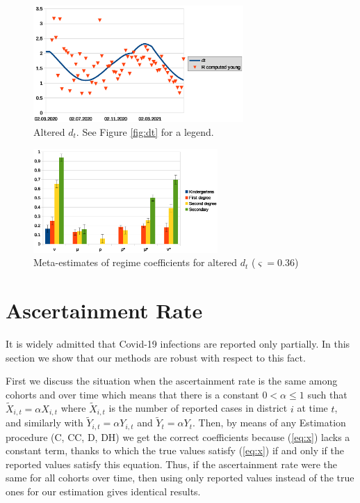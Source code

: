 \documentclass[fleqn,10pt]{wlscirep}
\begin{document}
\begin{figure}
\begin{center}
\includegraphics[width=8cm]{dtalt.eps} 
\caption{Altered $d_t$. See Figure \ref{fig:dt} for a legend.
}
\label{fig:dtalt}
\end{center}
\end{figure}

\begin{figure}
\begin{center}
\includegraphics[width=7cm]{coefsalt.eps}
\caption{Meta-estimates of regime coefficients for altered $d_t$ ($\varsigma=0.36$)}
\label{fig:metacompalt}
\end{center}
\end{figure}


\section{Ascertainment Rate}
\label{sec:asc}

It is widely admitted that Covid-19 infections are reported only partially. In this section we show that our methods are robust with respect to this fact. 

First we discuss the situation when the ascertainment rate is the same among cohorts and over time which means that there is a constant $0 < \alpha \leq 1$ such that $\tilde X_{i,t} = \alpha X_{i,t}$ where $\tilde X_{i,t}$ is the number of reported cases in district $i$ at time $t$, and similarly with $\tilde Y_{i,t}=\alpha Y_{i,t}$ and $\tilde Y_t = \alpha Y_t$. Then, by means of any Estimation procedure (C, CC, D, DH) we get the correct coefficients because (\ref{eq:x}) lacks a constant term, thanks to which the true values satisfy (\ref{eq:x}) if and only if the reported values satisfy this equation. Thus, if the ascertainment rate were the same for all cohorts over time, then using only reported values instead of the true ones for our estimation gives identical results.
\end{document}
